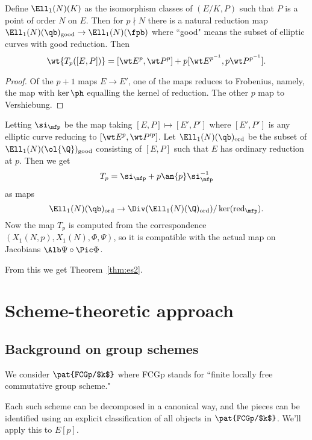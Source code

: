 \begin{pr}
Define $\Ell_1(N)(K)$ as the isomorphism classes of $(E/K,P)$ such that $P$ is a point of order $N$ on $E$. Then for $p\nmid N$ there is a natural reduction map $\Ell_1(N)(\qb)_{\text{good}}\to \Ell_1(N)(\fpb)$ where ``good" means the subset of elliptic curves with good reduction.
Then
\[
\wt{T_p([E,P])}=[\wt E^p,\wt P^p]+p[\wt E^{p^{-1}},p\wt P^{p^{-1}}].
\]
\end{pr}
\begin{proof}
Of the $p+1$ maps $E\to E'$, one of the maps reduces to Frobenius, namely, the map with $\ker\ph$ equalling the kernel of reduction. The other $p$ map to Vershiebung.
\end{proof}
Letting $\si_{\mfp}$ be the map taking $[E,P]\mapsto [E',P']$ where $[E',P']$ is any elliptic curve reducing to $[\wt E^p,\wt P'^p]$.  
Let $\Ell_1(N)(\qb)_{\text{ord}}$ be the subset of $\Ell_1(N)(\ol{\Q})_{\text{good}}$ consisting of $[E,P]$ such that $E$ has ordinary reduction at $p$. 
Then we get \[T_p=\si_\mfp+p\an{p}\si_\mfp^{-1}\]
as maps
\[
\Ell_1(N)(\qb)_{\text{ord}}\to \Div(\Ell_1(N)(\Q)_{\text{ord}})/\ker (\text{red}_{\mfp}).
\]
Now the map $T_p$ is computed from the correspondence $(X_1(N,p),X_1(N),\Phi,\Psi)$, so it is compatible with the actual map on Jacobians $\Alb \Psi \circ \Pic \Phi$. %

From this we get Theorem~\ref{thm:es2}.

\section{Scheme-theoretic approach}



\subsection{Background on group schemes}

We consider $\pat{FCGp/$k$}$ where FCGp stands for ``finite locally free commutative group scheme."

Each such scheme can be decomposed in a canonical way, and the pieces can be identified using an explicit classification of all objects in $\pat{FCGp/$k$}$. We'll apply this to $E[p]$.

